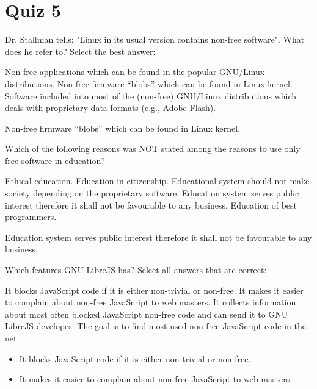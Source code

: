 \section{Quiz 5}
\begin{question}[type=exam]
Dr. Stallman tells: "Linux in its usual version contains non-free software". What does he refer to? Select the best answer:
\begin{itemize}
\chk Non-free applications which can be found in the popular GNU/Linux distributions.
\chk Non-free firmware “blobs” which can be found in Linux kernel.
\chk Software included into most of the (non-free) GNU/Linux distributions which deals with proprietary data formats (e.g., Adobe Flash).
\end{itemize}
\end{question}
\begin{solution}
Non-free firmware “blobs” which can be found in Linux kernel.
\end{solution}


\begin{question}[type=exam]
Which of the following reasons was NOT stated among the reasons to use only free software in education?
\begin{itemize}
\chk Ethical education. Education in citizenship.
\chk Educational system should not make society depending on the proprietary software.
\chk Education system serves public interest therefore it shall not be favourable to any business.
\chk Education of best programmers.
\end{itemize}
\end{question}
\begin{solution}
Education system serves public interest therefore it shall not be favourable to any business.
\end{solution}


\begin{question}[type=exam]
Which features GNU LibreJS has? Select all answers that are correct:
\begin{itemize}
\chk It blocks JavaScript code if it is either non-trivial or non-free.
\chk It makes it easier to complain about non-free JavaScript to web masters.
\chk It collects information about most often blocked JavaScript non-free code and can send it to GNU LibreJS developes. The goal is to find most used non-free JavaScript code in the net.
\end{itemize}
\end{question}
\begin{solution}
\begin{itemize}
\item It blocks JavaScript code if it is either non-trivial or non-free.
\item It makes it easier to complain about non-free JavaScript to web masters.
\end{itemize}
\end{solution}

